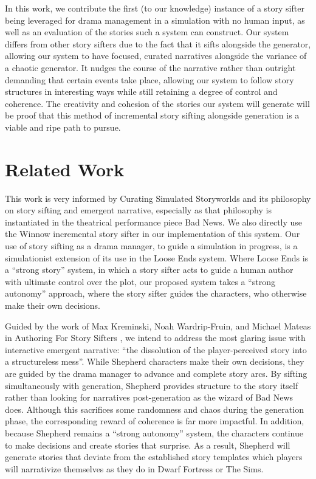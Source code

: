 \documentclass[letterpaper]{article}
\begin{document}
In this work, we contribute the first (to our knowledge) instance of a story sifter being
leveraged for drama management in a simulation with no human input, as well as an
evaluation of the stories such a system can construct. Our system differs from other story
sifters due to the fact that it sifts alongside the generator, allowing our system to have
focused, curated narratives alongside the variance of a chaotic generator. It nudges the
course of the narrative rather than outright demanding that certain events take place,
allowing our system to follow story structures in interesting ways while still retaining a
degree of control and coherence. The creativity and cohesion of the stories our system
will generate will be proof that this method of incremental story sifting alongside
generation is a viable and ripe path to pursue.

\section{Related Work}
This work is very informed by Curating Simulated Storyworlds \cite{ryan:curating} and its
philosophy on story sifting and emergent narrative, especially as that philosophy is
instantiated in the theatrical performance piece Bad News. We also directly use the Winnow
incremental story sifter in our implementation of this system. Our
use of story sifting as a drama manager, to guide a simulation in progress, is a
simulationist extension of its use in the Loose Ends system. 
Where
Loose Ends is a “strong story” system, in which a story sifter acts to guide a human
author with ultimate control over the plot, our proposed system takes a “strong autonomy”
approach, where the story sifter guides the characters, who otherwise make their own
decisions. 

Guided by the work of Max Kreminski, Noah Wardrip-Fruin, and Michael Mateas in Authoring
For Story Sifters \cite{kreminski:authoring}, we intend to address the most glaring issue
with interactive emergent narrative: “the dissolution of the player-perceived story into a
structureless mess”. While Shepherd characters make their own decisions, they are guided
by the drama manager to advance and complete story arcs. By sifting simultaneously with
generation, Shepherd provides structure to the story itself rather than looking for
narratives post-generation as the wizard of Bad News does. Although this sacrifices some
randomness and chaos during the generation phase, the corresponding reward of coherence is
far more impactful. In addition, because Shepherd remains a “strong autonomy” system, the
characters continue to make decisions and create stories that surprise. As a result,
Shepherd will generate stories that deviate from the established story templates which
players will narrativize themselves as they do in Dwarf Fortress or The Sims.
\end{document}
